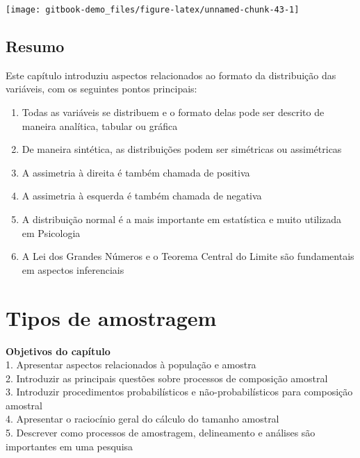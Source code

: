 \documentclass[
]{book}
\providecommand{\tightlist}{%
  \setlength{\itemsep}{0pt}\setlength{\parskip}{0pt}}
\newenvironment{objectives}{
  \definecolor{shadecolor}{rgb}{0.764,0.992,0.686}  %
  \color{black}
  \begin{shaded}}
 {\end{shaded}}
\begin{document}
\begin{center}\texttt{[image: gitbook-demo\_files/figure-latex/unnamed-chunk-43-1]} \end{center}

\hypertarget{resumo-3}{%
\section{Resumo}\label{resumo-3}}

Este capítulo introduziu aspectos relacionados ao formato da distribuição das variáveis, com os seguintes pontos principais:

\begin{enumerate}
\def\labelenumi{\arabic{enumi}.}
\tightlist
\item
  Todas as variáveis se distribuem e o formato delas pode ser descrito de maneira analítica, tabular ou gráfica\\
\item
  De maneira sintética, as distribuições podem ser simétricas ou assimétricas\\
\item
  A assimetria à direita é também chamada de positiva\\
\item
  A assimetria à esquerda é também chamada de negativa\\
\item
  A distribuição normal é a mais importante em estatística e muito utilizada em Psicologia\\
\item
  A Lei dos Grandes Números e o Teorema Central do Limite são fundamentais em aspectos inferenciais\\
\end{enumerate}

\hypertarget{tipos-de-amostragem}{%
\chapter{Tipos de amostragem}\label{tipos-de-amostragem}}

\begin{objectives}
\textbf{Objetivos do capítulo}\\
1. Apresentar aspectos relacionados à população e amostra\\
2. Introduzir as principais questões sobre processos de composição amostral\\
3. Introduzir procedimentos probabilísticos e não-probabilísticos para composição amostral\\
4. Apresentar o raciocínio geral do cálculo do tamanho amostral\\
5. Descrever como processos de amostragem, delineamento e análises são importantes em uma pesquisa

\end{objectives}
\end{document}
